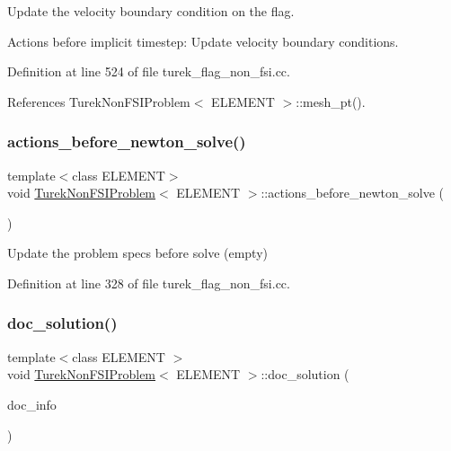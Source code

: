 Update the velocity boundary condition on the flag. 

Actions before implicit timestep\+: Update velocity boundary conditions. 

Definition at line 524 of file turek\+\_\+flag\+\_\+non\+\_\+fsi.\+cc.



References Turek\+Non\+F\+S\+I\+Problem$<$ E\+L\+E\+M\+E\+N\+T $>$\+::mesh\+\_\+pt().

\mbox{\label{classTurekNonFSIProblem_ae5881b3424aee1ba7b947fff96493d2f}} 
\subsubsection{\texorpdfstring{actions\+\_\+before\+\_\+newton\+\_\+solve()}{actions\_before\_newton\_solve()}}
{\footnotesize\ttfamily template$<$class E\+L\+E\+M\+E\+NT$>$ \\
void \hyperlink{classTurekNonFSIProblem}{Turek\+Non\+F\+S\+I\+Problem}$<$ E\+L\+E\+M\+E\+NT $>$\+::actions\+\_\+before\+\_\+newton\+\_\+solve (\begin{DoxyParamCaption}{ }\end{DoxyParamCaption})\hspace{0.3cm}{\ttfamily [inline]}}



Update the problem specs before solve (empty) 



Definition at line 328 of file turek\+\_\+flag\+\_\+non\+\_\+fsi.\+cc.

\mbox{\label{classTurekNonFSIProblem_a2f129e4eba71784a58b27d846fdc2a61}} 
\subsubsection{\texorpdfstring{doc\+\_\+solution()}{doc\_solution()}}
{\footnotesize\ttfamily template$<$class E\+L\+E\+M\+E\+NT $>$ \\
void \hyperlink{classTurekNonFSIProblem}{Turek\+Non\+F\+S\+I\+Problem}$<$ E\+L\+E\+M\+E\+NT $>$\+::doc\+\_\+solution (\begin{DoxyParamCaption}\item[{Doc\+Info \&}]{doc\+\_\+info }\end{DoxyParamCaption})}



